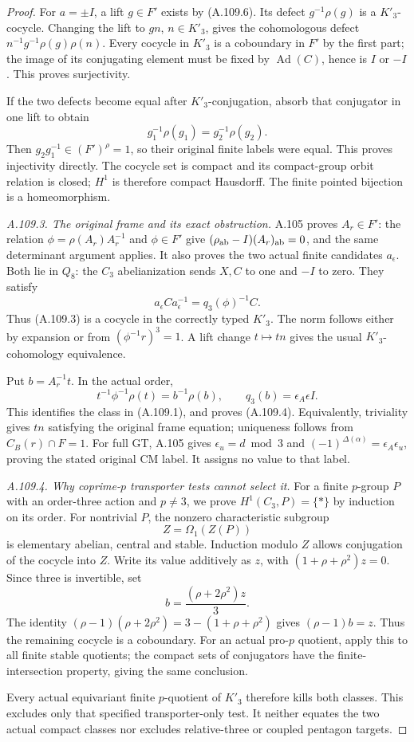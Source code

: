 \begin{proof}
For \(a=\pm I\), a lift \(g\in F'\) exists by (A.109.6).
Its defect \(g^{-1}\rho(g)\) is a \(K'_3\)-cocycle.
Changing the lift to \(gn\), \(n\in K'_3\), gives the cohomologous
defect \(n^{-1}g^{-1}\rho(g)\rho(n)\).
Every cocycle in \(K'_3\) is a coboundary in \(F'\) by the first
part; the image of its conjugating element must be fixed by
\(\operatorname{Ad}(C)\), hence is \(I\) or \(-I\).
This proves surjectivity.

If the two defects become equal after \(K'_3\)-conjugation, absorb
that conjugator in one lift to obtain
\[
 g_1^{-1}\rho(g_1)=g_2^{-1}\rho(g_2).
 \]
Then \(g_2g_1^{-1}\in(F')^\rho=1\), so their original finite
labels were equal. This proves injectivity directly.
The cocycle set is compact and its compact-group orbit relation
is closed; \(H^1\) is therefore compact Hausdorff. The finite
pointed bijection is a homeomorphism.

\emph{A.109.3. The original frame and its exact obstruction.}
A.105 proves \(A_r\in F'\): the relation
\(\phi=\rho(A_r)A_r^{-1}\) and \(\phi\in F'\) give
\((\rho_{\rm ab}-I)(A_r)_{\rm ab}=0\), and the same determinant
argument applies. It also proves the two actual finite candidates
\(a_\epsilon\). Both lie in \(Q_8\): the \(C_3\) abelianization
sends \(X,C\) to one and \(-I\) to zero. They satisfy
\[
 a_\epsilon C a_\epsilon^{-1}=q_3(\phi)^{-1}C.
 \]
Thus (A.109.3) is a cocycle in the correctly typed \(K'_3\).
The norm follows either by expansion or from
\((\phi^{-1}r)^3=1\). A lift change \(t\mapsto tn\) gives the
usual \(K'_3\)-cohomology equivalence.

Put \(b=A_r^{-1}t\). In the actual order,
\[
 t^{-1}\phi^{-1}\rho(t)=b^{-1}\rho(b),\qquad
 q_3(b)=\epsilon_A\epsilon I.
 \tag{A.109.7}
\]
This identifies the class in (A.109.1), and proves (A.109.4).
Equivalently, triviality gives \(tn\) satisfying the original
frame equation; uniqueness follows from \(C_B(r)\cap F=1\).
For full GT, A.105 gives
\(\epsilon_u=d\bmod3\) and
\((-1)^{\Delta(\alpha)}=\epsilon_A\epsilon_u\), proving the
stated original CM label. It assigns no value to that label.

\emph{A.109.4. Why coprime-\(p\) transporter tests cannot select it.}
For a finite \(p\)-group \(P\) with an order-three action and
\(p\ne3\), we prove \(H^1(C_3,P)=\{*\}\) by induction on its order.
For nontrivial \(P\), the nonzero characteristic subgroup
\[
 Z=\Omega_1(Z(P))
 \]
is elementary abelian, central and stable. Induction modulo \(Z\)
allows conjugation of the cocycle into \(Z\). Write its value
additively as \(z\), with
\((1+\rho+\rho^2)z=0\). Since three is invertible, set
\[
 b=\frac{(\rho+2\rho^2)z}{3}.
 \]
The identity
\((\rho-1)(\rho+2\rho^2)=3-(1+\rho+\rho^2)\) gives
\((\rho-1)b=z\). Thus the remaining cocycle is a coboundary.
For an actual pro-\(p\) quotient, apply this to all finite stable
quotients; the compact sets of conjugators have the
finite-intersection property, giving the same conclusion.

Every actual equivariant finite \(p\)-quotient of \(K'_3\)
therefore kills both classes. This excludes only that specified
transporter-only test. It neither equates the two actual compact
classes nor excludes relative-three or coupled pentagon targets.
\end{proof}

